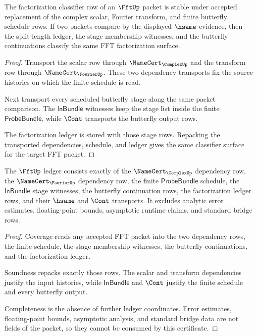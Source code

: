 \begin{theorem}
\label{thm:fft-factorization-classifier-stability-obligation}
The factorization classifier row of an $\FftUp$ packet is stable under
accepted replacement of the complex scalar, Fourier transform, and finite
butterfly schedule rows. If two packets compare by the displayed $\hsame$
evidence, then the split-length ledger, the stage membership witnesses, and
the butterfly continuations classify the same FFT factorization surface.
\end{theorem}
\begin{proof}
Transport the scalar row through $\NameCert_{\ComplexUp}$ and the transform
row through $\NameCert_{\FourierUp}$. These two dependency transports fix the
source histories on which the finite schedule is read.

Next transport every scheduled butterfly stage along the same packet
comparison. The $\mathsf{InBundle}$ witnesses keep the stage list inside the
finite $\mathsf{ProbeBundle}$, while $\Cont$ transports the butterfly output
rows.

The factorization ledger is stored with those stage rows. Repacking the
transported dependencies, schedule, and ledger gives the same classifier
surface for the target FFT packet.
\end{proof}

\begin{theorem}
\label{thm:fft-ledger-exactness-obligation}
The $\FftUp$ ledger consists exactly of the $\NameCert_{\ComplexUp}$
dependency row, the $\NameCert_{\FourierUp}$ dependency row, the finite
$\mathsf{ProbeBundle}$ schedule, the $\mathsf{InBundle}$ stage witnesses, the
butterfly continuation rows, the factorization ledger rows, and their
$\hsame$ and $\Cont$ transports. It excludes analytic error estimates,
floating-point bounds, asymptotic runtime claims, and standard bridge rows.
\end{theorem}
\begin{proof}
Coverage reads any accepted FFT packet into the two dependency rows, the
finite schedule, the stage membership witnesses, the butterfly
continuations, and the factorization ledger.

Soundness repacks exactly those rows. The scalar and transform dependencies
justify the input histories, while $\mathsf{InBundle}$ and $\Cont$ justify the
finite schedule and every butterfly output.

Completeness is the absence of further ledger coordinates. Error estimates,
floating-point bounds, asymptotic analysis, and standard bridge data are not
fields of the packet, so they cannot be consumed by this certificate.
\end{proof}

